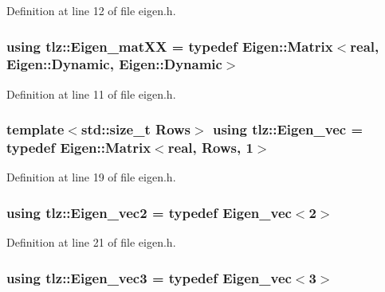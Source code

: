 Definition at line 12 of file eigen.\+h.

\subsubsection[{\texorpdfstring{Eigen\+\_\+mat\+XX}{Eigen_matXX}}]{\setlength{\rightskip}{0pt plus 5cm}using {\bf tlz\+::\+Eigen\+\_\+mat\+XX} = typedef Eigen\+::\+Matrix$<${\bf real}, Eigen\+::\+Dynamic, Eigen\+::\+Dynamic$>$}\hypertarget{namespacetlz_a5be0c2718335705e53acaa3de54120a1}{}\label{namespacetlz_a5be0c2718335705e53acaa3de54120a1}


Definition at line 11 of file eigen.\+h.

\subsubsection[{\texorpdfstring{Eigen\+\_\+vec}{Eigen_vec}}]{\setlength{\rightskip}{0pt plus 5cm}template$<$std\+::size\+\_\+t Rows$>$ using {\bf tlz\+::\+Eigen\+\_\+vec} = typedef Eigen\+::\+Matrix$<${\bf real}, Rows, 1$>$}\hypertarget{namespacetlz_a2956723eeab1e0b07f733e404d96e20e}{}\label{namespacetlz_a2956723eeab1e0b07f733e404d96e20e}


Definition at line 19 of file eigen.\+h.

\subsubsection[{\texorpdfstring{Eigen\+\_\+vec2}{Eigen_vec2}}]{\setlength{\rightskip}{0pt plus 5cm}using {\bf tlz\+::\+Eigen\+\_\+vec2} = typedef {\bf Eigen\+\_\+vec}$<$2$>$}\hypertarget{namespacetlz_a3c87ebfa36baeec6f6b28dd9f3911556}{}\label{namespacetlz_a3c87ebfa36baeec6f6b28dd9f3911556}


Definition at line 21 of file eigen.\+h.

\subsubsection[{\texorpdfstring{Eigen\+\_\+vec3}{Eigen_vec3}}]{\setlength{\rightskip}{0pt plus 5cm}using {\bf tlz\+::\+Eigen\+\_\+vec3} = typedef {\bf Eigen\+\_\+vec}$<$3$>$}\hypertarget{namespacetlz_a0d9cceede7be35e19a7173494ca6fb91}{}\label{namespacetlz_a0d9cceede7be35e19a7173494ca6fb91}



